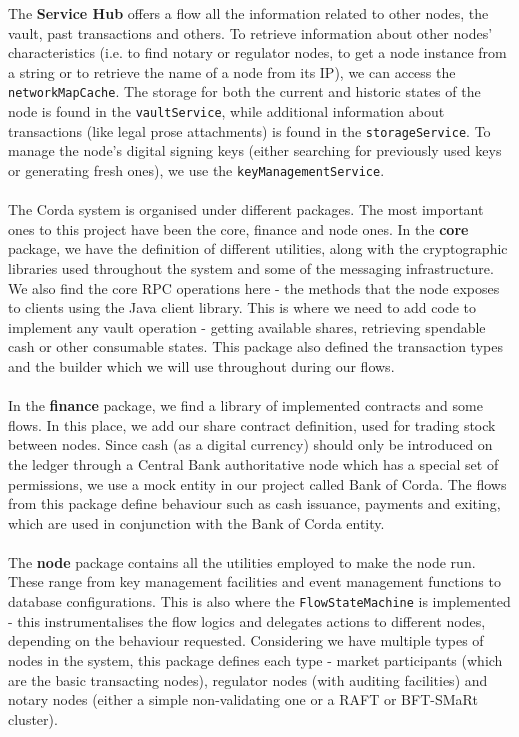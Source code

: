 \documentclass[12pt,twoside]{article}
\begin{document}
The \textbf{Service Hub} offers a flow all the information related to other nodes, the vault, past transactions and others. To retrieve information about other nodes' characteristics (i.e. to find notary or regulator nodes, to get a node instance from a string or to retrieve the name of a node from its IP), we can access the \verb|networkMapCache|. The storage for both the current and historic states of the node is found in the \verb|vaultService|, while additional information about transactions (like legal prose attachments) is found in the \verb|storageService|. To manage the node's digital signing keys (either searching for previously used keys or generating fresh ones), we use the \verb|keyManagementService|. 
\\ \\
The Corda system is organised under different packages. The most important ones to this project have been the core, finance and node ones. In the \textbf{core} package, we have the definition of different utilities, along with the cryptographic libraries used throughout the system and some of the messaging infrastructure. We also find the core RPC operations here - the methods that the node exposes to clients using the Java client library. This is where we need to add code to implement any vault operation - getting available shares, retrieving spendable cash or other consumable states. This package also defined the transaction types and the builder which we will use throughout during our flows.
\\ \\
In the \textbf{finance} package, we find a library of implemented contracts and some flows. In this place, we add our share contract definition, used for trading stock between nodes. Since cash (as a digital currency) should only be introduced on the ledger through a Central Bank authoritative node which has a special set of permissions, we use a mock entity in our project called Bank of Corda. The flows from this package define behaviour such as cash issuance, payments and exiting, which are used in conjunction with the Bank of Corda entity. 
\\ \\
The \textbf{node} package contains all the utilities employed to make the node run. These range from key management facilities and event management functions to database configurations. This is also where the \verb|FlowStateMachine| is implemented - this instrumentalises the flow logics and delegates actions to different nodes, depending on the behaviour requested. Considering we have multiple types of nodes in the system, this package defines each type - market participants (which are the basic transacting nodes), regulator nodes (with auditing facilities) and notary nodes (either a simple non-validating one or a RAFT or BFT-SMaRt cluster).
\end{document}
